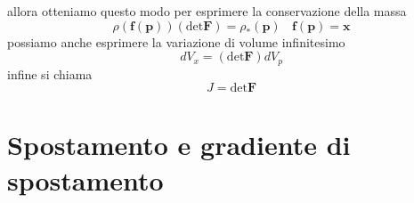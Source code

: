 \documentclass[10pt,a4paper,twoside]{book}
\begin{document}
allora otteniamo questo modo per esprimere la conservazione della massa
\begin{equation*}
\boxed{\rho (\mathbf{f}(\mathbf{p}))(\mathrm{det}\mathbf{F}) =\rho _{*}(\mathbf{p})} \ \ \ \ \mathbf{f}(\mathbf{p}) =\mathbf{x}
\end{equation*}
possiamo anche esprimere la variazione di volume infinitesimo
\begin{equation*}
\boxed{dV_{x} =(\mathrm{det}\mathbf{F}) dV_{p}}
\end{equation*}
infine si chiama
\begin{equation*}
\boxed{J=\mathrm{det}\mathbf{F}}
\end{equation*}
\section{Spostamento e gradiente di spostamento}
\end{document}
